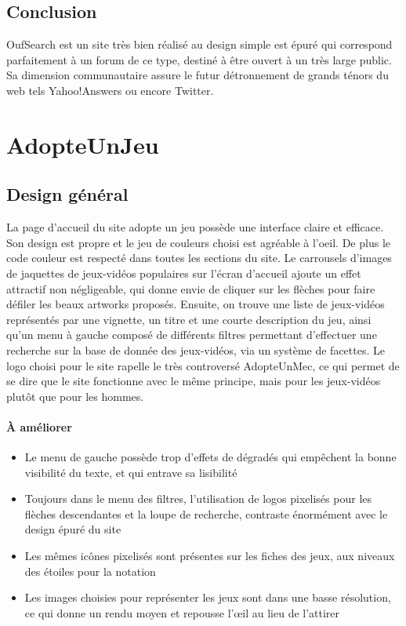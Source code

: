 \documentclass[a4paper,11pt]{article}
\begin{document}
\subsection{Conclusion}
OufSearch est un site très bien réalisé au design simple est épuré qui correspond parfaitement à un forum de ce type, destiné à être ouvert à un très large public. Sa dimension communautaire assure le futur détronnement de grands ténors du web tels Yahoo!Answers ou encore Twitter.

\newpage

\section{AdopteUnJeu}
\subsection{Design général}
La page d'accueil du site adopte un jeu possède une interface claire et efficace. Son design est propre et le jeu de couleurs choisi est agréable à l'oeil. De plus le code couleur est respecté dans toutes les sections du site. Le carrousels d'images de jaquettes de jeux-vidéos populaires sur l'écran d'accueil ajoute un effet attractif non négligeable, qui donne envie de cliquer sur les flèches pour faire défiler les beaux artworks proposés. Ensuite, on trouve une liste de jeux-vidéos représentés par une vignette, un titre et une courte description du jeu, ainsi qu'un menu à gauche composé de différents filtres permettant d'effectuer une recherche sur la base de donnée des jeux-vidéos, via un système de facettes. Le logo choisi pour le site rapelle le très controversé AdopteUnMec, ce qui permet de se dire que le site fonctionne avec le même principe, mais pour les jeux-vidéos plutôt que pour les hommes.
\paragraph{À améliorer}
\begin{itemize}
\item Le menu de gauche possède trop d'effets de dégradés qui empêchent la bonne visibilité du texte, et qui entrave sa lisibilité
\item Toujours dans le menu des filtres, l'utilisation de logos pixelisés pour les flèches descendantes et la loupe de recherche, contraste énormément avec le design épuré du site
\item Les mêmes icônes pixelisés sont présentes sur les fiches des jeux, aux niveaux des étoiles pour la notation
\item Les images choisies pour représenter les jeux sont dans une basse résolution, ce qui donne un rendu moyen et repousse l'œil au lieu de l'attirer
\end{itemize}
\end{document}
